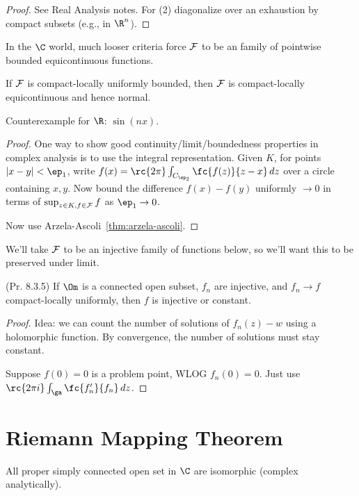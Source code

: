 \begin{proof}
See Real Analysis notes. For (2) diagonalize over an exhaustion by compact subsets (e.g., in $\R^n$).
\end{proof}

In the $\C$ world, much looser criteria force $\cal F$ to be an  family of pointwise bounded equicontinuous functions.
\begin{thm}[Montel]
If $\cal F$ is compact-locally uniformly bounded, then $\cal F$ is compact-locally equicontinuous and hence normal. 
\end{thm}
Counterexample for $\R$: $\sin(nx)$.
\begin{proof}
One way to show good continuity/limit/boundedness properties in complex analysis is to use the integral representation. Given $K$, for points $|x-y|<\ep_1$, write $f(x)=\rc{2\pi}\int_{C_{\ep_2}}\fc{f(z)}{z-x}\,dz$ over a circle containing $x,y$. Now bound the difference $f(x)-f(y)$ uniformly $\to 0$ in terms of $\sup_{z\in K, f\in \cal F} f$ as $\ep_1\to 0$.

Now use Arzela-Ascoli~\ref{thm:arzela-ascoli}.
\end{proof}

We'll take $\cal F$ to be an injective family of functions below, so we'll want this to be preserved under limit.
\begin{lem} (Pr. 8.3.5)
If $\Om$ is a connected open subset, $f_n$ are injective, and $f_n\to f$ compact-locally uniformly, then $f$ is injective or constant.
\end{lem}
\begin{proof}
Idea: we can count the number of solutions of $f_n(z)-w$ using a holomorphic function. By convergence, the number of solutions must stay constant.

Suppose $f(0)=0$ is a problem point, WLOG $f_n(0)=0$. Just use $\rc{2\pi i}\int_\ga \fc{f_n'}{f_n}\,dz$.
\end{proof}

\section{Riemann Mapping Theorem}
\begin{thm}
All proper simply connected open set in $\C$ are isomorphic (complex analytically).
\end{thm}

